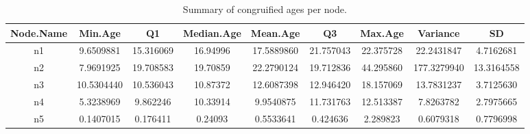 \begin{table}

\caption{\label{tab:table2}Summary of congruified ages per node.}
\centering
\begin{tabular}[t]{c|c|c|c|c|c|c|c|c}
\hline
Node.Name & Min.Age & Q1 & Median.Age & Mean.Age & Q3 & Max.Age & Variance & SD\\
\hline
n1 & 9.6509881 & 15.316069 & 16.94996 & 17.5889860 & 21.757043 & 22.375728 & 22.2431847 & 4.7162681\\
\hline
n2 & 7.9691925 & 19.708583 & 19.70859 & 22.2790124 & 19.712836 & 44.295860 & 177.3279940 & 13.3164558\\
\hline
n3 & 10.5304440 & 10.536043 & 10.87372 & 12.6087398 & 12.946420 & 18.157069 & 13.7831237 & 3.7125630\\
\hline
n4 & 5.3238969 & 9.862246 & 10.33914 & 9.9540875 & 11.731763 & 12.513387 & 7.8263782 & 2.7975665\\
\hline
n5 & 0.1407015 & 0.176411 & 0.24093 & 0.5533641 & 0.424636 & 2.289823 & 0.6079318 & 0.7796998\\
\hline
\end{tabular}
\end{table}
